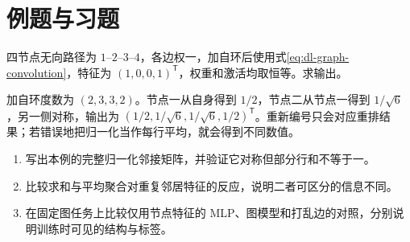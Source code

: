 \section{例题与习题}
\begin{example}[路径图的一层聚合]
四节点无向路径为 $1$--$2$--$3$--$4$，各边权一，加自环后使用式\eqref{eq:dl-graph-convolution}，特征为 $(1,0,0,1)^\mathsf T$，权重和激活均取恒等。求输出。
\end{example}
\begin{solve}
加自环度数为 $(2,3,3,2)$。节点一从自身得到 $1/2$，节点二从节点一得到 $1/\sqrt6$，另一侧对称，输出为 $(1/2,1/\sqrt6,1/\sqrt6,1/2)^\mathsf T$。重新编号只会对应重排结果；若错误地把归一化当作每行平均，就会得到不同数值。
\end{solve}
\begin{enumerate}
\item 写出本例的完整归一化邻接矩阵，并验证它对称但部分行和不等于一。
\item 比较求和与平均聚合对重复邻居特征的反应，说明二者可区分的信息不同。
\item 在固定图任务上比较仅用节点特征的 MLP、图模型和打乱边的对照，分别说明训练时可见的结构与标签。
\end{enumerate}

